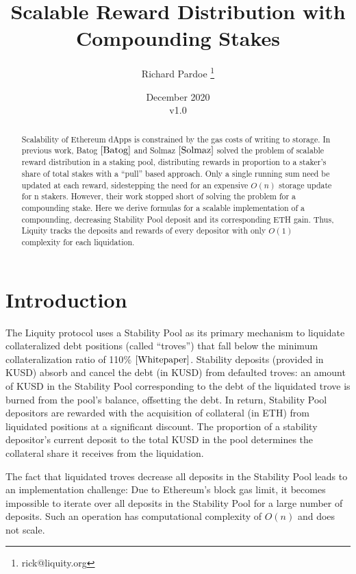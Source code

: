 \documentclass[reqno]{article}
\begin{document}
\title{\textbf{Scalable Reward Distribution with Compounding Stakes}}
\author{Richard Pardoe \thanks{rick@liquity.org}}
\date{December 2020\\v1.0}
\maketitle
\begin{abstract}
    Scalability of Ethereum dApps is constrained by the gas costs of writing to storage. 
    In previous work, Batog $\cite{Batog}$ and Solmaz $\cite{Solmaz}$ solved the problem of scalable reward distribution in a staking pool, distributing rewards in proportion to a staker’s share of total stakes with a ``pull'' based approach. Only a single running sum need be updated at each reward, sidestepping the need for an expensive $O(n)$ storage update for n stakers. However, their work stopped short of solving the problem for a compounding stake.
    Here we derive formulas for a scalable implementation of a compounding, decreasing Stability Pool deposit and its corresponding ETH gain. Thus, Liquity tracks the deposits and rewards of every depositor with only $O(1)$ complexity for each liquidation.
\end{abstract}

\section{Introduction}
The Liquity protocol uses a Stability Pool as its primary mechanism to liquidate collateralized debt positions (called ``troves'') that fall below the minimum collateralization ratio of 110$\%$ $\cite{Whitepaper}$. Stability deposits (provided in KUSD) absorb and cancel the debt (in KUSD) from defaulted troves: an amount of KUSD in the Stability Pool corresponding to the debt of the liquidated trove is burned from the pool’s balance, offsetting the debt. In return, Stability Pool depositors are rewarded with the acquisition of collateral (in ETH) from liquidated positions at a significant discount. The proportion of a stability depositor’s current deposit to the total KUSD in the pool determines the collateral share it receives from the liquidation. 

The fact that liquidated troves decrease all deposits in the Stability Pool leads to an implementation challenge: Due to Ethereum's block gas limit, it becomes impossible to iterate over all deposits in the Stability Pool for a large number of deposits. Such an operation has computational complexity of $O(n)$ and does not scale. 
\end{document}
